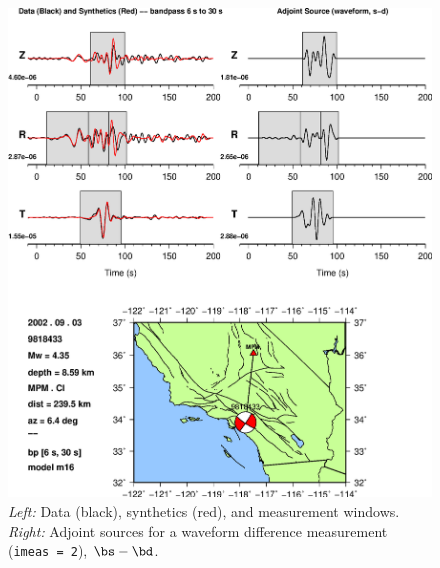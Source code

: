\documentclass[11pt,titlepage,fleqn]{article}
\begin{document}
\begin{figure}
\includegraphics[width=17cm]{9818433_T006_T030_MPM_CI_m16_iker02_win_adj.eps}
\caption[]
{{
{\em Left:} Data (black), synthetics (red), and measurement windows.
{\em Right:} Adjoint sources for a waveform difference measurement ({\tt imeas = 2}), $\bs - \bd$.
\label{fig:iker02}
}}
\end{figure}
\end{document}
